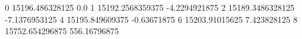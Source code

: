 0 15196.486328125 0.0
1 15192.2568359375 -4.2294921875
2 15189.3486328125 -7.1376953125
4 15195.849609375 -0.63671875
6 15203.91015625 7.423828125
8 15752.654296875 556.16796875
